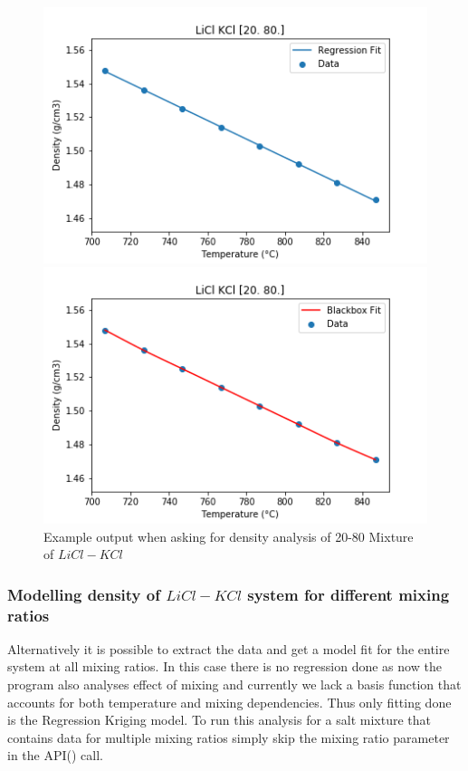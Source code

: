 \begin{figure}[h]
\centering
\begin{minipage}{0.5\textwidth}
  \centering
  \includegraphics[width=\linewidth]{msdf/figures/LiCl20Reg.png}
\end{minipage}%
\begin{minipage}{0.5\textwidth}
  \centering
  \includegraphics[width=\linewidth]{msdf/figures/LiCl20Bl.png}
\end{minipage}
\caption{Example output when asking for density analysis of 20-80 Mixture of $LiCl-KCl$}
\label{fig:Licl20}
\end{figure}

\subsubsection{Modelling density of $LiCl-KCl$ system for different mixing ratios}
Alternatively it is possible to extract the data and get a model fit for the entire system at all mixing ratios. In this case there is no regression done as now the program also analyses effect of mixing and currently we lack a basis function that accounts for both temperature and mixing dependencies. Thus only fitting done is the Regression Kriging model. To run this analysis for a salt mixture that contains data for multiple mixing ratios simply skip the mixing ratio parameter in the API() call.

